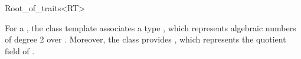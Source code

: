 \begin{ccRefClass}{Root_of_traits<RT>}


\ccDefinition

For a   , the class template 
 associates a type , which represents 
algebraic numbers of degree 2 over . Moreover, the class provides 
, which represents the quotient field of . 


\ccTypes


\ccSeeAlso

\\
\\
\end{ccRefClass}
